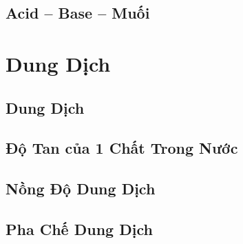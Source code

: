 \documentclass{article}
\numberwithin{equation}{section}
\begin{document}

\subsection{Acid -- Base -- Muối}


\section{Dung Dịch}

\subsection{Dung Dịch}


\subsection{Độ Tan của 1 Chất Trong Nước}


\subsection{Nồng Độ Dung Dịch}


\subsection{Pha Chế Dung Dịch}


\printbibliography[heading=bibintoc]
	
\end{document}
